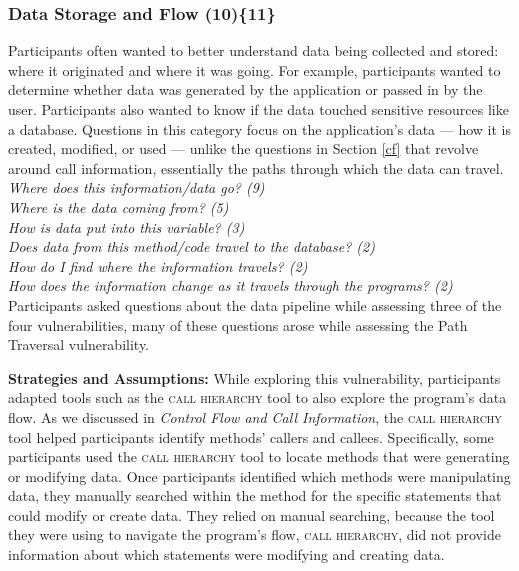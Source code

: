 \documentclass[10pt,journal,compsoc]{IEEEtran}
\begin{document}
%	
%


\subsubsection{Data Storage and Flow (10)\{11\}}\label{dsf}

Participants often wanted to better understand data being collected and stored: where it originated and where it was going. 
For example, participants wanted to determine whether data was generated by the application or passed in by the user. 
Participants also wanted to know if the data touched sensitive resources like a database.
Questions in this category focus on the application's data --- how it is created, modified, or used --- unlike the questions in Section \ref{cf} that revolve around call information, essentially the paths through which the data can travel.
\\

\noindent\emph{Where does this information/data go? (9)} \\
\emph{Where is the data coming from? (5)} \\
\emph{How is data put into this variable? (3)} \\
\emph{Does data from this method/code travel to the database? (2)} \\
\emph{How do I find where the information travels? (2)} \\
\emph{How does the information change as it travels through the programs? (2)} 
\\

 
Participants asked questions about the data pipeline while assessing three of the four vulnerabilities, many of these questions arose while assessing the Path Traversal vulnerability. 


\textbf{Strategies and Assumptions:}
While exploring this vulnerability, participants adapted tools such as the \textsc{call hierarchy} tool to also explore the program's data flow. 
As we discussed in \emph{Control Flow and Call Information}, the \textsc{call hierarchy} tool helped participants identify methods' callers and callees.
Specifically, some participants used the \textsc{call hierarchy} tool to locate methods that were generating or modifying data.
Once participants identified which methods were manipulating data, they manually searched within the method for the specific statements that could modify or create data.
They relied on manual searching, because the tool they were using to navigate the program's flow, \textsc{call hierarchy}, did not provide information about which statements were modifying and creating data.
\end{document}
